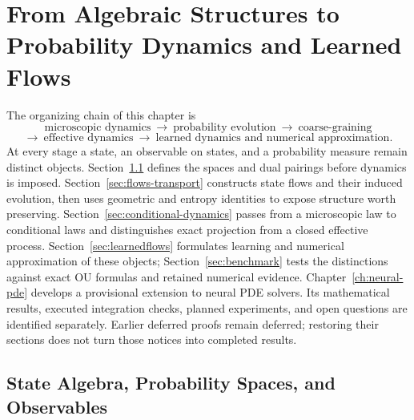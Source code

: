 \documentclass[12pt,a4paper,oneside]{book}
\begin{document}
\clearpage

\mainmatter

\chapter{From Algebraic Structures to Probability Dynamics and Learned Flows}
\label{ch:minimal-framework}


The organizing chain of this chapter is
\begin{equation*}
 \text{microscopic dynamics}\ \longrightarrow\ \text{probability evolution}
 \ \longrightarrow\ \text{coarse-graining}
\end{equation*}
\begin{equation*}
 \longrightarrow\ \text{effective dynamics}\ \longrightarrow\
 \text{learned dynamics and numerical approximation}.
\end{equation*}
At every stage a state, an observable on states, and a probability measure remain distinct objects.
Section~\ref{sec:physical-mathematical-setting} defines the spaces and dual pairings before dynamics is imposed.
Section~\ref{sec:flows-transport} constructs state flows and their induced evolution, then uses geometric and entropy
identities to expose structure worth preserving. Section~\ref{sec:conditional-dynamics} passes from a microscopic law
to conditional laws and distinguishes exact projection from a closed effective process.
Section~\ref{sec:learnedflows} formulates learning and numerical approximation of these objects;
Section~\ref{sec:benchmark} tests the distinctions against exact OU formulas and retained numerical evidence.
Chapter~\ref{ch:neural-pde} develops a provisional extension to neural PDE solvers. Its mathematical results,
executed integration checks, planned experiments, and open questions are identified separately.
Earlier deferred proofs remain deferred; restoring their sections does not turn those notices into completed results.

\section{State Algebra, Probability Spaces, and Observables}
\label{sec:physical-mathematical-setting}
\end{document}

